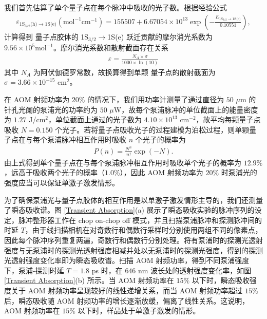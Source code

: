 \documentclass{thesis}
\begin{document}
我们首先估算了单个量子点在每个脉冲中吸收的光子数。根据经验公式\cite{jasieniak2009re}
\begin{align}
    \varepsilon_{\text{1S}_{3/2}\text{(h)}\rightarrow\text{1S(e)}}(\text{mol}^{-1}\text{cm}^{-1})=155507+6.67054\times 10^{13}\exp\left(-\frac{E_{\text{1S}_{3/2}\rightarrow\text{1S(e)}}}{0.10551}\right),
\end{align}
计算得到  量子点胶体的 1S$_{3/2}\rightarrow$1S(e) 跃迁贡献的摩尔消光系数为 $9.56\times 10^5\text{mol}^{-1}$。摩尔消光系数和散射截面存在关系\cite{jasieniak2009re}
\begin{align}
    \varepsilon=\frac{N_A\times\sigma}{1000\times\ln(10)}
\end{align}
其中 $N_A$ 为阿伏伽德罗常数，故换算得到单颗  量子点的散射截面为 $\sigma=3.66\times 10^{-15}$ cm$^2$。

在 AOM 射频功率为 $20\%$ 的情况下，我们用功率计测量了通过直径为 $50$ $\mu$m 的针孔光阑的泵浦光的功率约为 $50$ $\mu$W，故每个泵浦脉冲的单位截面上的能量密度为 $1.27$ J/cm$^2$，单位截面上通过的光子数为 $4.10\times 10^{13}$ cm$^{-2}$，故平均每颗量子点吸收 $N=0.150$ 个光子。若将量子点吸收光子的过程建模为泊松过程，则单颗量子点在与每个泵浦脉冲相互作用时吸收 $n$ 个光子的概率为
\begin{align}
    P(n)=\frac{N^n}{n!}\exp(-N).
\end{align}
由上式得到单个量子点在与每个泵浦脉冲相互作用时吸收单个光子的概率为 $12.9\%$，远高于吸收两个光子的概率（$1.0\%$），因此 AOM 射频功率为 $20\%$ 时泵浦光的强度应当可以保证单激子激发情形。

为了确保泵浦光与量子点胶体的相互作用是以单激子激发情形主导的，我们还测量了瞬态吸收谱。图 \ref{Transient Absorption}(a) 展示了瞬态吸收实验的脉冲序列的设定，脉冲整形器工作在 chop on-chop off 模式，并且扫描泵浦脉冲和探测脉冲间的时延 $T$，由于线扫描相机在对奇数行和偶数行采样时分别使用两组不同的像素点，因此每个脉冲序列重复两遍，奇数行和偶数行分别处理。将有泵浦时的探测光透射强度与无泵浦时的探测光透射强度相减并处以无泵浦时的探测光强度，得到的探测光透射强度变化率即为瞬态吸收谱。扫描 AOM 射频功率，得到不同泵浦强度下，泵浦-探测时延 $T=1.8$ ps 时，在 $646$ nm 波长处的透射强度变化率，如图 \ref{Transient Absorption}(b) 所示。当 AOM 射频功率在 $15\%$ 以下时，瞬态吸收强度关于 AOM 射频功率呈现较好的线性递增关系，而当 AOM 射频功率超过 $15\%$ 后，瞬态吸收随 AOM 射频功率的增长逐渐放缓，偏离了线性关系。这说明，AOM 射频功率在 $15\%$ 以下时，样品处于单激子激发的情形。
\end{document}
